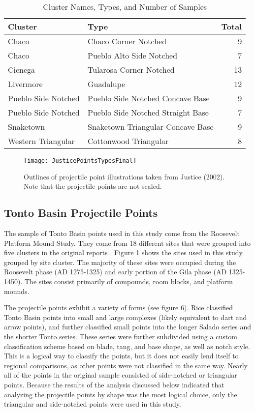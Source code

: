 \documentclass[PCJ,Unicode,screen,mode=plain]{cedram}
\begin{document}
\begin{table}

\caption{\label{tab:tblJusticeTypes}Cluster Names, Types, and Number of Samples}
\centering
\begin{tabular}[t]{llr}
\toprule
Cluster & Type & Total\\
\midrule
Chaco & Chaco Corner Notched & 9\\
Chaco & Pueblo Alto Side Notched & 7\\
Cienega & Tularosa Corner Notched & 13\\
Livermore & Guadalupe & 12\\
Pueblo Side Notched & Pueblo Side Notched Concave Base & 9\\
\addlinespace
Pueblo Side Notched & Pueblo Side Notched Straight Base & 7\\
Snaketown & Snaketown Triangular Concave Base & 9\\
Western Triangular & Cottonwood Triangular & 8\\
\bottomrule
\end{tabular}
\end{table}

\begin{figure}
\texttt{[image: JusticePointsTypesFinal]} \caption{Outlines of projectile point illustrations taken from Justice (2002). Note that the projectile points are not scaled.}\label{fig:JusticePointsTypesFinal}
\end{figure}

\subsection{Tonto Basin Projectile Points}

The sample of Tonto Basin points used in this study come from the Roosevelt Platform Mound Study. They come from 18 different sites that were grouped into five clusters in the original reports \autocite[see][ for an overview]{Rice1998-ku}. Figure 1 shows the sites used in this study grouped by site cluster. The majority of these sites were occupied during the Roosevelt phase (AD 1275-1325) and early portion of the Gila phase (AD 1325-1450). The sites consist primarily of compounds, room blocks, and platform mounds.

The projectile points exhibit a variety of forms (see figure 6). Rice \autocite*{Rice1994-rk} classified Tonto Basin points into small and large complexes (likely equivalent to dart and arrow points), and further classified small points into the longer Salado series and the shorter Tonto series. These series were further subdivided using a custom classification scheme based on blade, tang, and base shape, as well as notch style. This is a logical way to classify the points, but it does not easily lend itself to regional comparisons, as other points were not classified in the same way. Nearly all of the points in the original sample consisted of side-notched or triangular points. Because the results of the analysis discussed below indicated that analyzing the projectile points by shape was the most logical choice, only the triangular and side-notched points were used in this study.
\end{document}
